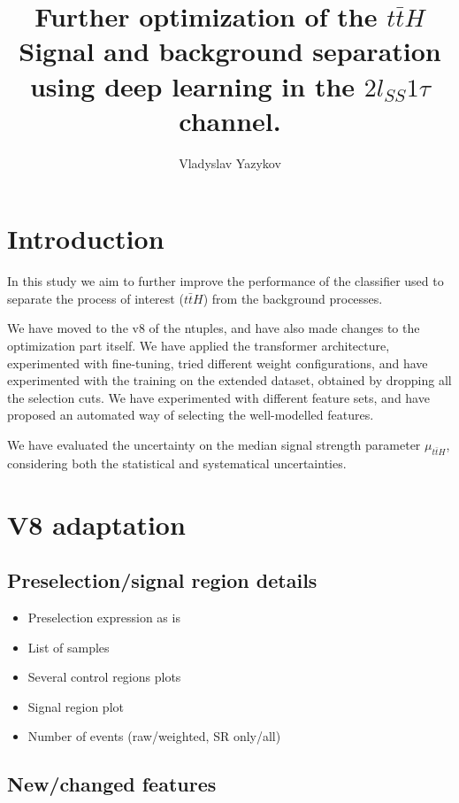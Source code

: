 \documentclass[twoside,draft,a4paper]{article}
\title{Further optimization of the $t\bar{t}H$ Signal and background separation using deep learning in the $2l_{SS}1\tau$ channel.}
\author{Vladyslav Yazykov}
\begin{document}
\maketitle



\section{Introduction}

In this study we aim to further improve the performance of the classifier used to separate the process of interest
($t\bar{t}H$) from the background processes.

We have moved to the v8 of the ntuples, and have also made changes to the optimization part itself. We have applied the
transformer architecture, experimented with fine-tuning, tried different weight configurations, and have experimented
with the training on the extended dataset, obtained by dropping all the selection cuts. We have experimented with
different feature sets, and have proposed an automated way of selecting the well-modelled features.

We have evaluated the uncertainty on the median signal strength parameter $\mu_{t\bar{t}H}$, considering both the
statistical and systematical uncertainties.



\section{V8 adaptation}


\subsection{Preselection/signal region details}

\begin{itemize}
    \item Preselection expression as is
    \item List of samples
    \item Several control regions plots
    \item Signal region plot
    \item Number of events (raw/weighted, SR only/all)
\end{itemize}


\subsection{New/changed features}
\end{document}
